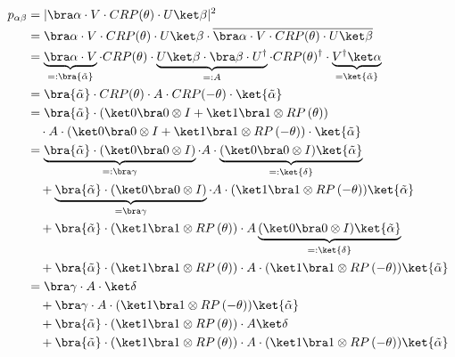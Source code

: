 \begin{equation}
    \label{eq:single-prob}
    \begin{split}
        p_{\alpha\beta}
            &= \lvert \bra\alpha \cdot V \cdot CRP(\theta) \cdot U \ket\beta \rvert^2 \\
            &= \bra\alpha \cdot V \cdot CRP(\theta) \cdot U \ket\beta
                \cdot \overline{\bra\alpha \cdot V \cdot CRP(\theta) \cdot U \ket\beta} \\
            &= \underbrace{\bra\alpha \cdot V}_{=: \bra{\tilde\alpha}} \cdot CRP(\theta)
                \cdot \underbrace{U \ket\beta \cdot \bra\beta \cdot U^\dagger}_{=: A} \cdot CRP(\theta)^\dagger
                \cdot \underbrace{V^\dagger \ket\alpha}_{=\ket{\tilde\alpha}} \\
            &= \bra{\tilde\alpha} \cdot CRP(\theta) \cdot A \cdot CRP(-\theta) \cdot \ket{\tilde\alpha} \\
            &= \bra{\tilde\alpha}
                \cdot \left(\ket 0 \bra 0 \otimes I + \ket 1 \bra 1 \otimes RP\left(\theta\right)\right) \\
                &\quad \cdot A
                \cdot \left(\ket 0 \bra 0 \otimes I + \ket 1 \bra 1 \otimes RP\left(-\theta\right)\right)
                \cdot \ket{\tilde\alpha} \\
            &= \underbrace{\bra{\tilde\alpha} \cdot (\ket 0 \bra 0 \otimes I)}_{=: \bra\gamma} \cdot A \cdot \underbrace{(\ket 0 \bra 0 \otimes I) \ket{\tilde\alpha}}_{=: \ket{\delta}} \\
                &\quad + \underbrace{\bra{\tilde\alpha} \cdot (\ket 0 \bra 0 \otimes I)}_{= \bra\gamma} \cdot A \cdot (\ket 1 \bra 1 \otimes RP\left(-\theta\right)) \ket{\tilde\alpha} \\
                &\quad + \bra{\tilde\alpha} \cdot (\ket 1 \bra 1 \otimes RP\left(\theta\right)) \cdot A \underbrace{(\ket 0 \bra 0 \otimes I) \ket{\tilde\alpha}}_{=: \ket{\delta}} \\
                &\quad + \bra{\tilde\alpha} \cdot (\ket 1 \bra 1 \otimes RP\left(\theta\right)) \cdot A \cdot (\ket 1 \bra 1 \otimes RP\left(-\theta\right)) \ket{\tilde\alpha} \\
            &= \bra\gamma \cdot A \cdot \ket\delta \\
                &\quad + \bra\gamma \cdot A \cdot (\ket 1 \bra 1 \otimes RP\left(-\theta\right)) \ket{\tilde\alpha} \\
                &\quad + \bra{\tilde\alpha} \cdot (\ket 1 \bra 1 \otimes RP\left(\theta\right)) \cdot A \ket\delta \\
                &\quad + \bra{\tilde\alpha} \cdot (\ket 1 \bra 1 \otimes RP\left(\theta\right)) \cdot A \cdot (\ket 1 \bra 1 \otimes RP\left(-\theta\right)) \ket{\tilde\alpha} \\
    \end{split}
\end{equation}

